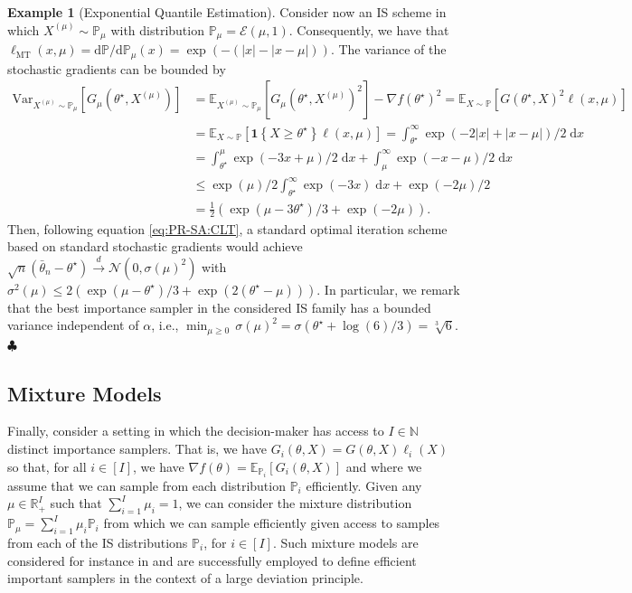 \documentclass[11pt,a4paper]{article}
\theoremstyle{definition}
\newtheorem{example}[theorem]{Example}
\DeclareMathOperator*{\MT}{MT}
\newcommand{\one}[1]{\mathbf 1 \left\{ #1 \right\}}
\renewcommand{\Re}{\mathbb R}
\newcommand{\mb}{\mathbb}
\begin{document}
\begin{example}[Exponential Quantile Estimation]
Consider now an IS scheme in which $X^{(\mu)} \sim \mathbb P_\mu$ with distribution $\mathbb P_\mu=\mathcal E(\mu, 1)$. Consequently, we have that $\ell_{\MT}(x, \mu) ={\mathrm{d} \mathbb P}/{\mathrm{d} \mathbb P_\mu}(x)= \exp(-(|x|-|x-\mu|))$. The variance of the stochastic gradients can be bounded by
\begin{align*}
\text{Var}_{X^{(\mu)} \sim \mathbb P_\mu}\left[G_\mu(\theta^\star,X^{(\mu)})\right] & = \mathbb E_{X^{(\mu)} \sim \mathbb P_\mu}\left[G_\mu(\theta^\star,X^{(\mu)})^2\right] - \nabla f(\theta^\star)^2
=  \mathbb E_{X \sim \mathbb P}\left[G(\theta^\star,X)^2 \ell(x, \mu)\right]\\
& = \mathbb E_{X \sim \mathbb P}\left[\one{X\geq \theta^\star} \ell(x, \mu)\right]
= \int_{\theta^\star}^\infty \exp(-2|x|+|x-\mu|)/2 \; \text{d} x\\
& = \int_{\theta^\star}^\mu  \exp(-3x+\mu)/2 \; \text{d} x + \int^\infty_\mu\exp(-x-\mu)/2 \; \text{d} x\\
&\leq  \exp(\mu)/2 \int_{\theta^\star}^\infty  \exp(-3x) \; \text{d} x + \exp(-2\mu)/2\\
& = \frac{1}{2}\left(\exp(\mu-3\theta^\star)/3 + \exp(-2\mu)\right).
\end{align*}
Then, following equation \eqref{eq:PR-SA:CLT}, a standard optimal iteration scheme based on standard stochastic gradients would achieve
\(
\sqrt{n}\left( \bar{\theta}_n - \theta^\star \right) \overset{d}{\to} \mathcal N \left(0, \sigma(\mu)^2  \right)
\)
with
\(
\sigma^2(\mu) \leq 2\left(\exp(\mu-\theta^\star)/3 + \exp(2(\theta^\star-\mu))\right).
\)
In particular, we remark that the best importance sampler in the considered IS family has a bounded variance independent of $\alpha$, i.e.,
\(
\min_{\mu\geq 0}\,\sigma(\mu)^2  = \sigma(\theta^\star+\log(6)/3) = \sqrt[3]{6}.
\) \hfill $\clubsuit$
\end{example}





\subsection{Mixture Models}

Finally, consider a setting in which the decision-maker has access to $I\in \mathbb N$ distinct importance samplers. That is, we have
$G_i(\theta, X) = G(\theta, X) \ell_i(X)$ so that, for all $i\in[I]$, we have $\nabla f(\theta) = \mathbb E_{\mathbb P_i}\left[G_i(\theta, X)\right]$ and where we assume that we can sample from each distribution $\mb P_i$ efficiently. Given any $\mu\in\Re^I_+$ such that $\sum_{i=1}^I\mu_i=1$, we can consider the mixture distribution
\(
  \mb P_\mu = \sum_{i=1}^I \mu_i\mathbb P_i
\)
from which we can sample efficiently given access to samples from each of the IS distributions $\mb P_i$, for $i\in [I]$. Such mixture models are considered for instance in \cite[Section 5.2.2]{bucklew2004introduction} and are successfully employed to define efficient important samplers in the context of a large deviation principle. 
\end{document}
